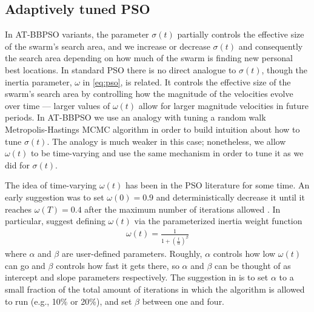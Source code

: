 \documentclass[12pt]{article}
\begin{document}
\subsection{Adaptively tuned PSO}\label{sec:AT-PSO}
In AT-BBPSO variants, the parameter $\sigma(t)$ partially controls the effective size of the swarm's search area, and we increase or decrease $\sigma(t)$ and consequently the search area depending on how much of the swarm is finding new personal best locations. In standard PSO there is no direct analogue to $\sigma(t)$, though the inertia parameter, $\omega$ in \eqref{eq:pso}, is related. It controls the effective size of the swarm's search area by controlling how the magnitude of the velocities evolve over time --- larger values of $\omega(t)$ allow for larger magnitude velocities in future periods. In AT-BBPSO we use an analogy with tuning a random walk Metropolis-Hastings MCMC algorithm in order to build intuition about how to tune $\sigma(t)$. The analogy is much weaker in this case; nonetheless, we allow $\omega(t)$ to be time-varying and use the same mechanism in order to tune it as we did for $\sigma(t)$.

The idea of time-varying $\omega(t)$ has been in the PSO literature for some time. An early suggestion was to set $\omega(0)=0.9$ and deterministically decrease it until it reaches $\omega(T)=0.4$ after the maximum number of iterations allowed \citep{eberhart2000comparing}. In particular, \citet{tuppadung2011comparing} suggest defining $\omega(t)$ via the parameterized inertia weight function
\begin{align}\label{eq:inertiafun}
\omega(t) = \frac{1}{1 + \left(\frac{t}{\alpha}\right)^{\beta}}
\end{align}
where $\alpha$ and $\beta$ are user-defined parameters. Roughly, $\alpha$ controls how low $\omega(t)$ can go and $\beta$ controls how fast it gets there, so $\alpha$ and $\beta$ can be thought of as intercept and slope parameters respectively. The suggestion in \citet{tuppadung2011comparing} is to set $\alpha$ to a small fraction of the total amount of iterations in which the algorithm is allowed to run (e.g., 10\% or 20\%), and set $\beta$ between one and four.
\end{document}
